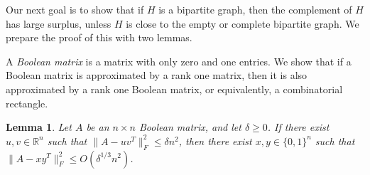 \documentclass[11pt]{article}
\theoremstyle{plain}
\newtheorem{lemma}[theorem]{Lemma}
\theoremstyle{definition}
\begin{document}
Our next goal is to show that if $H$ is a bipartite graph, then the complement of $H$ has large surplus, unless $H$ is close to the empty or complete bipartite graph. We prepare the proof of this with two lemmas.

A \emph{Boolean matrix} is a matrix with only zero and one entries. We show that if a Boolean  matrix is approximated by a rank one matrix, then it is also approximated by a rank one Boolean matrix, or equivalently, a combinatorial rectangle.

\begin{lemma}\label{lemma:rank1_approximation}
Let $A$ be an $n\times n$ Boolean matrix, and let $\delta\geq 0$. If there exist $u,v\in \mathbb{R}^n$ such that $\|A-uv^T\|_F^2\leq \delta n^2$, then there exist $x,y\in \{0,1\}^n$  such that $\|A-xy^T\|_F^2\leq O(\delta^{1/3}n^2)$.
\end{lemma}
\end{document}
